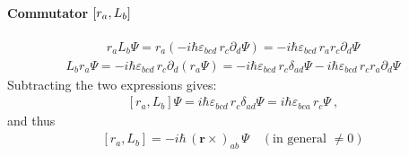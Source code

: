 \documentclass[letterpaper,10pt,english]{jupyterBook}
\begin{document}
\paragraph{Commutator \protect\([r_a, L_b]\protect\)}
\label{\detokenize{ch/quantum-mechanics/atom-models/schrodinger-notes:commutator-r-a-l-b}}\begin{equation*}
\begin{split}r_a L_b \Psi = r_a (-i\hbar \varepsilon_{bcd} \, r_c \partial_d \Psi) = -i\hbar \varepsilon_{bcd} \, r_a r_c \partial_d \Psi\end{split}
\end{equation*}\begin{equation*}
\begin{split}L_b r_a \Psi = -i\hbar \varepsilon_{bcd} \, r_c \partial_d (r_a \Psi) = -i\hbar \varepsilon_{bcd} \, r_c \delta_{ad} \Psi - i\hbar \varepsilon_{bcd} \, r_c r_a \partial_d \Psi\end{split}
\end{equation*}
\sphinxAtStartPar
Subtracting the two expressions gives:
\begin{equation*}
\begin{split}[r_a, L_b] \Psi = i\hbar \varepsilon_{bcd} \, r_c \delta_{ad} \Psi = i\hbar \varepsilon_{bca} \, r_c \Psi \ ,\end{split}
\end{equation*}
\sphinxAtStartPar
and thus
\begin{equation*}
\begin{split}[r_a, L_b] =-  i \hbar \, (\mathbf{r} \times)_{a b} \, \Psi \quad \left(\text{in general } \neq 0\right)\end{split}
\end{equation*}
\sphinxAtStartPar
{}
\end{document}
